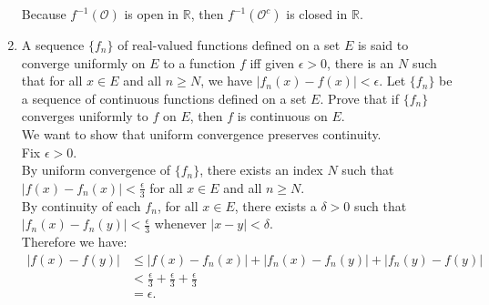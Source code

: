 \begin{enumerate}
\[	\]
	Because $f^{-1}(\mathcal{O})$ is open in $\mathbb{R}$, then $f^{-1}(\mathcal{O}^c)$ is closed in $\mathbb{R}$.   
	\item A sequence $\{f_n\}$ of real-valued functions defined on a set $E$ is said to converge uniformly on $E$ to a function $f$ iff given $\epsilon >0$, there is an $N$ such that for all $x \in E$ and all $n \ge N$, we have $|f_n(x) - f(x)| < \epsilon$. Let $\{f_n\}$ be a sequence of continuous functions defined on a set $E$. Prove that if $\{f_n\}$ converges uniformly to $f$ on $E$, then $f$ is continuous on $E$.\\
	We want to show that uniform convergence preserves continuity.\\
	Fix $\epsilon>0$.\\
	By uniform convergence of $\{f_n\}$, there exists an index $N$ such that $|f(x)-f_n(x)|<\frac{\epsilon}{3}$ for all $x\in E$ and all $n\ge N$.\\
	By continuity of each $f_n$, for all $x\in E$, there exists a $\delta>0$ such that $|f_n(x)-f_n(y)|<\frac{\epsilon}{3}$ whenever $|x-y|<\delta$.\\
	Therefore we have:
	\begin{align*}
		|f(x)-f(y)|&\le|f(x)-f_n(x)|+|f_n(x)-f_n(y)|+|f_n(y)-f(y)|\\
		&<\frac{\epsilon}{3}+\frac{\epsilon}{3}+\frac{\epsilon}{3}\\
		&=\epsilon.
	\end{align*}
\end{enumerate}
